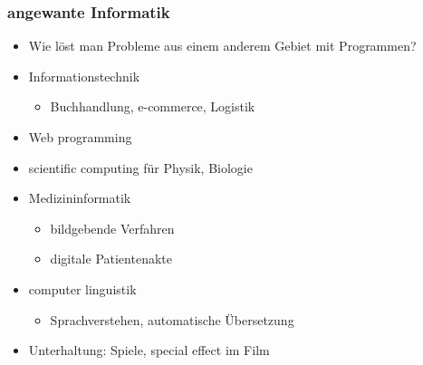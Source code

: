 \documentclass[11pt]{article}
\begin{document}
\subsubsection{angewante Informatik}
\label{sec-2-1-4}
\begin{itemize}
\item Wie löst man Probleme aus einem anderem Gebiet mit Programmen?
\item Informationstechnik
\begin{itemize}
\item Buchhandlung, e-commerce, Logistik
\end{itemize}
\item Web programming
\item scientific computing für Physik, Biologie
\item Medizininformatik
\begin{itemize}
\item bildgebende Verfahren
\item digitale Patientenakte
\end{itemize}
\item computer linguistik
\begin{itemize}
\item Sprachverstehen, automatische Übersetzung
\end{itemize}
\item Unterhaltung: Spiele, special effect im Film
\end{itemize}
\end{document}
